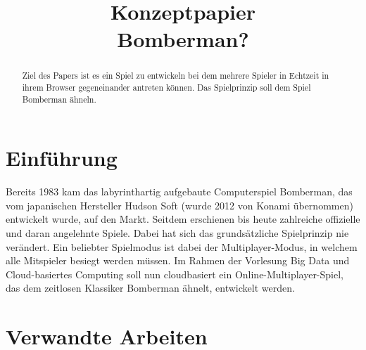 \documentclass[conference]{IEEEtran}
\begin{document}
\title{Konzeptpapier\\Bomberman?}

\author{
	\and

	\and

	\and

	\and

}

\maketitle

\begin{abstract}
	Ziel des Papers ist es ein Spiel zu entwickeln bei dem mehrere Spieler in Echtzeit in ihrem Browser gegeneinander antreten können. Das Spielprinzip soll dem Spiel \glqq Bomberman\grqq{} ähneln.
\end{abstract}

\section{Einführung}



Bereits 1983 kam das labyrinthartig aufgebaute Computerspiel Bomberman, das vom japanischen Hersteller Hudson Soft (wurde 2012 von Konami übernommen) entwickelt wurde, auf den Markt. Seitdem erschienen bis heute zahlreiche offizielle und daran angelehnte Spiele. Dabei hat sich das grundsätzliche Spielprinzip nie verändert.
Ein beliebter Spielmodus ist dabei der Multiplayer-Modus, in welchem alle Mitspieler besiegt werden müssen.
Im Rahmen der Vorlesung Big Data und Cloud-basiertes Computing soll nun cloudbasiert ein Online-Multiplayer-Spiel, das dem zeitlosen Klassiker Bomberman ähnelt, entwickelt werden.






\section{Verwandte Arbeiten}
\end{document}
